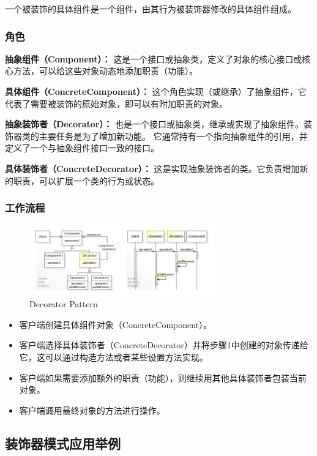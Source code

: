 一个被装饰的具体组件是一个组件，由其行为被装饰器修改的具体组件组成。

\subsubsection{角色}

\textbf{抽象组件（Component）：}
这是一个接口或抽象类，定义了对象的核心接口或核心方法，可以给这些对象动态地添加职责（功能）。

\textbf{具体组件（ConcreteComponent）：}
这个角色实现（或继承）了抽象组件，它代表了需要被装饰的原始对象，即可以有附加职责的对象。

\textbf{抽象装饰者（Decorator）：}
也是一个接口或抽象类，继承或实现了抽象组件。装饰器类的主要任务是为了增加新功能。
它通常持有一个指向抽象组件的引用，并定义了一个与抽象组件接口一致的接口。

\textbf{具体装饰者（ConcreteDecorator）：}
这是实现抽象装饰者的类。它负责增加新的职责，可以扩展一个类的行为或状态。

\subsubsection{工作流程}
\begin{figure}[h]
    \centering
    \includegraphics[width=8cm]{res/W3sDesign_Decorator_Design_Pattern_UML.jpg}
    \caption{Decorator Pattern}
\end{figure}

\begin{itemize}
	\item 客户端创建具体组件对象（ConcreteComponent）。
	\item 客户端选择具体装饰者（ConcreteDecorator）并将步骤1中创建的对象传递给它，这可以通过构造方法或者某些设置方法实现。
	\item 客户端如果需要添加额外的职责（功能），则继续用其他具体装饰者包装当前对象。
	\item 客户端调用最终对象的方法进行操作。
\end{itemize}

\subsection{装饰器模式应用举例}


